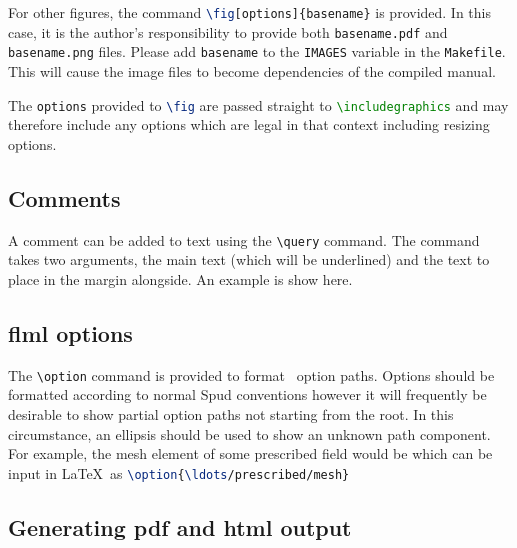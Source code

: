 For other figures, the command
\lstinline[language=TeX]+\fig[options]{basename}+ is provided. In this case,
it is the author's responsibility to provide both \verb+basename.pdf+ and
\verb+basename.png+ files. Please add \verb+basename+ to the \verb+IMAGES+
variable in the \verb+Makefile+. This will cause the image files to become
dependencies of the compiled manual.

The \lstinline[language=TeX]+options+ provided to
\lstinline[language=TeX]+\fig+ are passed straight to
\lstinline[language=TeX]+\includegraphics+ and may therefore include any
options which are legal in that context including resizing options.

\subsection{Comments}

A comment can be added to text using the \verb+\query+ command. The command
takes two arguments, the main text (which will be underlined) and the text to
place in the margin alongside. An example is show here. 
\begin{comment}
Example comment
\end{comment}

\subsection{flml options}

The \verb+\option+ command is provided to format \fluidity\ option
paths. Options should be formatted according to normal Spud conventions
however it will frequently be desirable to show partial option paths not
starting from the root. In this circumstance, an ellipsis should be used to
show an unknown path component. For example, the mesh element of some
prescribed field would be  which can be input
in \LaTeX\ as \lstinline[language=TeX]+\option{\ldots/prescribed/mesh}+

\subsection{Generating pdf and html output}

